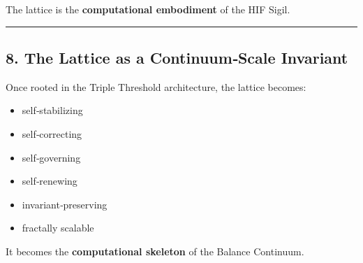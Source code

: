 The lattice is the \textbf{computational embodiment} of the HIF Sigil.

\begin{center}\rule{0.5\linewidth}{0.5pt}\end{center}

\subsection{8. The Lattice as a Continuum‑Scale Invariant}\label{the-lattice-as-a-continuumscale-invariant}

Once rooted in the Triple Threshold architecture, the lattice becomes:

\begin{itemize}
\tightlist
\item
  self‑stabilizing\\
\item
  self‑correcting\\
\item
  self‑governing\\
\item
  self‑renewing\\
\item
  invariant‑preserving\\
\item
  fractally scalable
\end{itemize}

It becomes the \textbf{computational skeleton} of the Balance Continuum.
